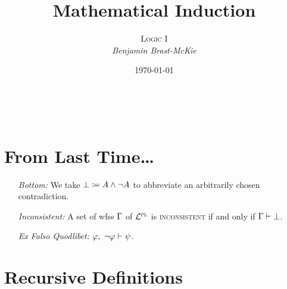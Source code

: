 \documentclass[a4paper, 11pt]{article} %
\title{\textbf{Mathematical Induction}} %
\author{\textsc{Logic I}\\ \em Benjamin Brast-McKie} %
\date{\today} %
\makeatletter
\renewcommand{\maketitle}{
\begin{flushright}
{\LARGE\@title}

\vspace{10pt}

{\@author}
\\ \@date
\end{flushright}

\vspace{0pt}

}
\makeatother
\begin{document}
\maketitle %

\thispagestyle{empty}


\section*{From Last Time\ldots}

\begin{enumerate}
  \item[\it Bottom:] We take $\bot \coloneq A\wedge\neg A$ to abbreviate an arbitrarily chosen contradiction.
  \item[\it Inconsistent:] A set of wfss $\Gamma$ of $\mathcal{L}^{\textsc{pl}}$ is \textsc{inconsistent} if and only if $\Gamma\vdash\bot$.
  \item[\it Ex Falso Quodlibet:] $\varphi,\ \neg \varphi \vdash \psi$.
\end{enumerate}






\section*{Recursive Definitions}
\end{document}
